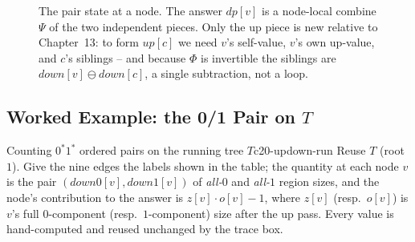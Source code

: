 \begin{figure}[H]
\centering
{}
\caption{The pair state at a node. The answer $\mathit{dp}[v]$ is a
node-local combine $\Psi$ of the two independent pieces. Only the up piece is
new relative to Chapter~13: to form $\mathit{up}[c]$ we need $v$'s self-value,
$v$'s own up-value, and $c$'s siblings -- and because $\Phi$ is invertible the
siblings are $\mathit{down}[v]\ominus\mathit{down}[c]$, a single subtraction,
not a loop.}\label{fig:c20-parentpiece}
\end{figure}

\subsection{Worked Example: the 0/1 Pair on $T$}

\begin{example}{Counting $0^{\ast}1^{\ast}$ ordered pairs on the running tree $T$}{c20-updown-run}
Reuse $T$ (root $1$). Give the nine edges the labels shown in the table; the
quantity at each node $v$ is the pair $(\mathit{down}0[v], \mathit{down}1[v])$
of \emph{all-$0$} and \emph{all-$1$} region sizes, and the node's contribution
to the answer is $z[v]\cdot o[v]-1$, where $z[v]$ (resp.\ $o[v]$) is $v$'s full
$0$-component (resp.\ $1$-component) size after the up pass. Every value is
hand-computed and reused unchanged by the trace box.
\end{example}

